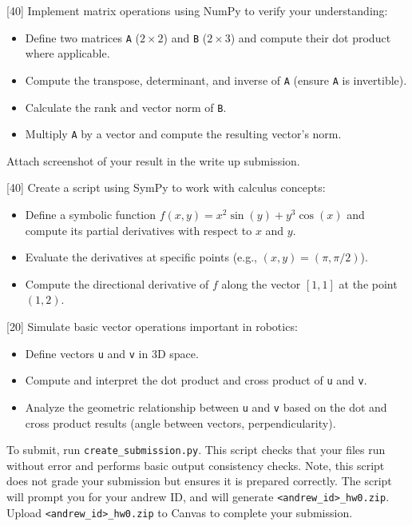 \documentclass{16384_doc}
\begin{document}
\begin{questions}
    [40]
        Implement matrix operations using NumPy to verify your understanding:
        \begin{itemize}
            \item Define two matrices \verb!A! (\(2 \times 2\)) and \verb!B! (\(2 \times 3\)) and compute their dot product where applicable.
            \item Compute the transpose, determinant, and inverse of \verb!A! (ensure \verb!A! is invertible).
            \item Calculate the rank and vector norm of \verb!B!.
            \item Multiply \verb!A! by a vector and compute the resulting vector's norm.
        \end{itemize}
        Attach screenshot of your result in the write up submission.

    [40]
        Create a script using SymPy to work with calculus concepts:
        \begin{itemize}
            \item Define a symbolic function \( f(x, y) = x^2 \sin(y) + y^3 \cos(x) \) and compute its partial derivatives with respect to \( x \) and \( y \).
            \item Evaluate the derivatives at specific points (e.g., \( (x, y) = (\pi, \pi/2) \)).
            \item Compute the directional derivative of \( f \) along the vector \([1, 1]\) at the point \( (1, 2) \).
        \end{itemize}

    [20]
        Simulate basic vector operations important in robotics:
        \begin{itemize}
            \item Define vectors \verb!u! and \verb!v! in 3D space.
            \item Compute and interpret the dot product and cross product of \verb!u! and \verb!v!.
            \item Analyze the geometric relationship between \verb!u! and \verb!v! based on the dot and cross product results (angle between vectors, perpendicularity).
        \end{itemize}

        To submit, run \verb!create_submission.py!. This script checks that your files run without error and performs basic output consistency checks. Note, this script does not grade your submission but ensures it is prepared correctly. The script will prompt you for your andrew ID, and will generate \verb!<andrew_id>_hw0.zip!. Upload \verb!<andrew_id>_hw0.zip! to Canvas to complete your submission.

\end{questions}
\end{document}
